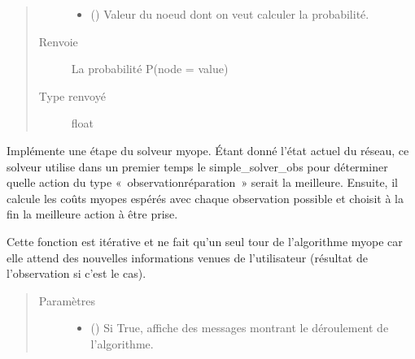\documentclass[letterpaper,10pt,french]{sphinxmanual}
\begin{document}
\begin{fulllineitems}
\begin{fulllineitems}
\begin{quote}
\begin{description}
\begin{itemize}
\item {} 
 () \textendash{} Valeur du noeud dont on veut calculer la probabilité.

\end{itemize}

\item[{Renvoie}] \leavevmode
La probabilité P(node = value)

\item[{Type renvoyé}] \leavevmode
float

\end{description}\end{quote}

\end{fulllineitems}


\begin{fulllineitems}
\label{\detokenize{index:DecisionTheoreticTroubleshooting.TroubleShootingProblem.myopic_solver}}
Implémente une étape du solveur myope. Étant donné l’état actuel du
réseau, ce solveur utilise dans un premier temps le simple\_solver\_obs
pour déterminer quelle action du type « observation\sphinxhyphen{}réparation » serait
la meilleure. Ensuite, il calcule les coûts myopes espérés avec chaque
observation possible et choisit à la fin la meilleure action à être
prise.

Cette fonction est itérative et ne fait qu’un seul tour de
l’algorithme myope car elle attend des nouvelles informations venues
de l’utilisateur (résultat de l’observation si c’est le cas).
\begin{quote}\begin{description}
\item[{Paramètres}] \leavevmode\begin{itemize}
\item {} 
 (\sphinxstyleliteralemphasis{\sphinxupquote{, }}) \textendash{} Si True, affiche des messages montrant le déroulement de
l’algorithme.


\end{itemize}
\end{description}
\end{quote}
\end{fulllineitems}
\end{fulllineitems}
\end{document}
